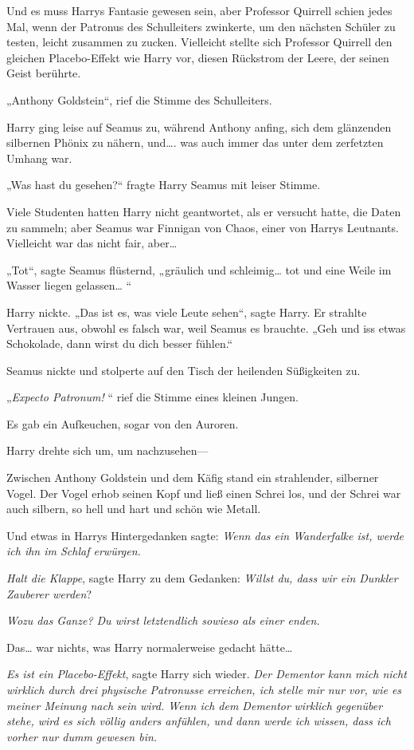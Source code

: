 {Und es muss Harrys Fantasie gewesen sein, aber Professor Quirrell schien jedes Mal, wenn der Patronus des Schulleiters zwinkerte, um den nächsten Schüler zu testen, leicht zusammen zu zucken. Vielleicht stellte sich Professor Quirrell den gleichen Placebo-Effekt wie Harry vor, diesen Rückstrom der Leere, der seinen Geist berührte.

„Anthony Goldstein“, rief die Stimme des Schulleiters.

Harry ging leise auf Seamus zu, während Anthony anfing, sich dem glänzenden silbernen Phönix zu nähern, und…. was auch immer das unter dem zerfetzten Umhang war.

„Was hast du gesehen?“ fragte Harry Seamus mit leiser Stimme.

Viele Studenten hatten Harry nicht geantwortet, als er versucht hatte, die Daten zu sammeln; aber Seamus war Finnigan von Chaos, einer von Harrys Leutnants. Vielleicht war das nicht fair, aber…

„Tot“, sagte Seamus flüsternd, „gräulich und schleimig… tot und eine Weile im Wasser liegen gelassen… “

Harry nickte. „Das ist es, was viele Leute sehen“, sagte Harry. Er strahlte Vertrauen aus, obwohl es falsch war, weil Seamus es brauchte. „Geh und iss etwas Schokolade, dann wirst du dich besser fühlen.“

Seamus nickte und stolperte auf den Tisch der heilenden Süßigkeiten zu.

„\emph{Expecto Patronum!} “ rief die Stimme eines kleinen Jungen.

Es gab ein Aufkeuchen, sogar von den Auroren.

Harry drehte sich um, um nachzusehen—

Zwischen Anthony Goldstein und dem Käfig stand ein strahlender, silberner Vogel. Der Vogel erhob seinen Kopf und ließ einen Schrei los, und der Schrei war auch silbern, so hell und hart und schön wie Metall.

Und etwas in Harrys Hintergedanken sagte: \emph{Wenn das ein Wanderfalke ist, werde ich ihn im Schlaf erwürgen.}

\emph{Halt die Klappe}, sagte Harry zu dem Gedanken: \emph{Willst du, dass wir ein Dunkler Zauberer werden}?

\emph{Wozu das Ganze? Du wirst letztendlich sowieso als einer enden.}

Das… war nichts, was Harry normalerweise gedacht hätte…

\emph{Es ist ein Placebo-Effekt}, sagte Harry sich wieder. \emph{Der Dementor kann mich nicht wirklich durch drei physische} \emph{Patronusse} \emph{erreichen, ich stelle mir nur vor, wie es meiner Meinung nach} \emph{sein wird. Wenn ich dem Dementor} \emph{wirklich} \emph{gegenüber stehe, wird es sich völlig anders anfühlen, und dann werde ich wissen, dass ich vorher nur dumm} \emph{gewesen bin.}

}
